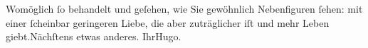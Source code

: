 \pstart
           Womöglich ſo behandelt und geſehen, wie Sie gewöhnlich Nebenfiguren ſehen: mit einer
               ſcheinbar geringeren Liebe, die aber zuträglicher iſt und mehr Leben giebt.\hspace*{2.5em}Nächſtens etwas anderes.\pend
           \pstart Ihr\spacefill\mbox{Hugo.}\pend{}\endnumbering{}  
      
